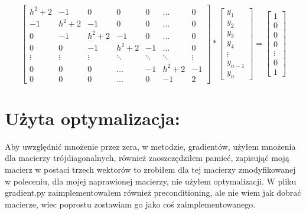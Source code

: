 \documentclass[12pt]{article}
\begin{document}
\[
\begin{bmatrix}
    h^{2}+2 & -1 & 0 & 0 & 0 & \dots & 0\\
    -1 & h^{2}+2 & -1 & 0 & 0 & \dots & 0\\ 
    0 & -1 & h^{2}+2 & -1 & 0 & \dots & 0\\
    0 & 0 & -1 & h^{2}+2 & -1 &\dots & 0\\
    \vdots & \vdots & \vdots & \ddots & \ddots & \ddots & \vdots\\
    0 & 0 & 0 & \hdots & -1 & h^{2}+2 & -1\\
    0 & 0 & 0 & \hdots & 0 & -1 & 2
\end{bmatrix}
*
\begin{bmatrix}
    y_{1}\\
    y_{2}\\
    y_{3}\\
    y_{4}\\
    \vdots\\
    y_{n-1}\\
    y_{n}
\end{bmatrix}
=
\begin{bmatrix}
    1\\
    0\\
    0\\
    0\\
    \vdots\\
    0\\
    1
\end{bmatrix}
\]
\section{Użyta optymalizacja:}
Aby uwzględnić mnożenie przez zera, w metodzie, gradientów, użyłem mnożenia dla macierzy trójdiagonalnych, również zaoszczędziłem pamieć, zapisująć moją macierz w postaci trzech wektorów to zrobiłem dla tej macierzy zmodyfikowanej w poleceniu, dla mojej naprawionej macierzy, nie użyłem optymalizacji. W pliku gradient.py zaimplementowałem również preconditioning, ale nie wiem jak dobrać macierze, wiec poprostu zostawiam go jako coś zaimplementowanego.
\end{document}
